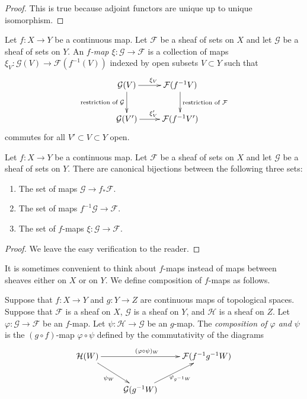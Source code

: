 \begin{proof}
This is true because adjoint functors are unique up to unique isomorphism.
\end{proof}


\begin{definition}
\label{definition-f-map}
Let $f : X \to Y$ be a continuous map.
Let $\mathcal{F}$ be a sheaf of sets on $X$ and
let $\mathcal{G}$ be a sheaf of sets on $Y$.
An {\it $f$-map $\xi : \mathcal{G} \to \mathcal{F}$}
is a collection of maps
$\xi_V : \mathcal{G}(V) \to \mathcal{F}(f^{-1}(V))$
indexed by open subsets $V \subset Y$ such that
$$
\xymatrix{
\mathcal{G}(V) \ar[r]^{\xi_V} \ar[d]_{\text{restriction of }\mathcal{G}} &
\mathcal{F}(f^{-1}V) \ar[d]^{\text{restriction of }\mathcal{F}} \\
\mathcal{G}(V') \ar[r]^{\xi_V'} &
\mathcal{F}(f^{-1}V')
}
$$
commutes for all $V' \subset V \subset Y$ open.
\end{definition}

\begin{lemma}
\label{lemma-f-map}
Let $f : X \to Y$ be a continuous map.
Let $\mathcal{F}$ be a sheaf of sets on $X$ and
let $\mathcal{G}$ be a sheaf of sets on $Y$.
There are canonical bijections between the following three sets:
\begin{enumerate}
\item The set of maps $\mathcal{G} \to f_*\mathcal{F}$.
\item The set of maps $f^{-1}\mathcal{G} \to \mathcal{F}$.
\item The set of $f$-maps $\xi : \mathcal{G} \to \mathcal{F}$.
\end{enumerate}
\end{lemma}

\begin{proof}
We leave the easy verification to the reader.
\end{proof}

\noindent
It is sometimes convenient to think about $f$-maps
instead of maps between sheaves either on $X$ or on $Y$.
We define composition of $f$-maps as follows.

\begin{definition}
\label{definition-composition-f-maps}
Suppose that $f : X \to Y$ and $g : Y \to Z$ are continuous
maps of topological spaces. Suppose that $\mathcal{F}$ is
a sheaf on $X$, $\mathcal{G}$ is a sheaf on $Y$, and
$\mathcal{H}$ is a sheaf on $Z$.
Let $\varphi : \mathcal{G} \to \mathcal{F}$ be an $f$-map.
Let $\psi : \mathcal{H} \to \mathcal{G}$ be an $g$-map.
The {\it composition of $\varphi$ and $\psi$} is the
$(g \circ f)$-map $\varphi \circ \psi$ defined
by the commutativity of the diagrams
$$
\xymatrix{
\mathcal{H}(W) \ar[rr]^{(\varphi \circ \psi)_W}
\ar[rd]_{\psi_W} & &
\mathcal{F}(f^{-1}g^{-1}W) \\
&
\mathcal{G}(g^{-1}W)
\ar[ru]_{\varphi_{g^{-1}W}}
}
$$
\end{definition}

